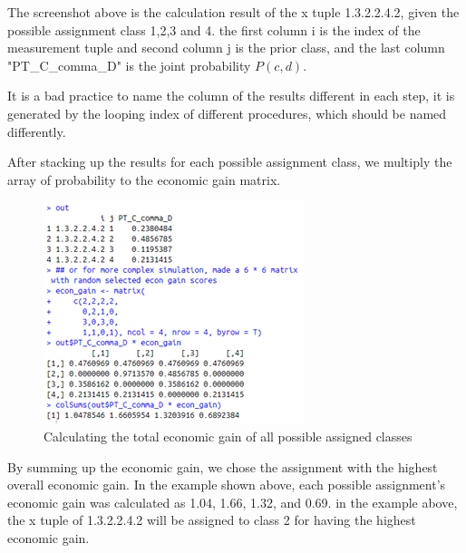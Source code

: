 \documentclass{article}
\begin{document}
\begin{multicols}{2}
        The screenshot above is the calculation result of the x tuple 1.3.2.2.4.2, given the possible assignment class 1,2,3 and 4. the first column i is the index of the measurement tuple and second column j is the prior class, and the last column "PT\_C\_comma\_D" is the joint probability $P(c,d)$.
        
        It is a bad practice to name the column of the results different in each step, it is generated by the looping index of different procedures, which should be named differently.

        After stacking up the results for each possible assignment class, we multiply the array of probability to the economic gain matrix. 

        \begin{figure}[H]
            \centering 
            \includegraphics[width=\linewidth]{fig9.png}
            \caption{Calculating the total economic gain of all possible assigned classes}
        \end{figure}

        By summing up the economic gain, we chose the assignment with the highest overall economic gain. In the example shown above, each possible assignment's economic gain was calculated as 1.04, 1.66, 1.32, and 0.69. in the example above, the x tuple of 1.3.2.2.4.2 will be assigned to class 2 for having the highest economic gain.


\end{multicols}
\end{document}
